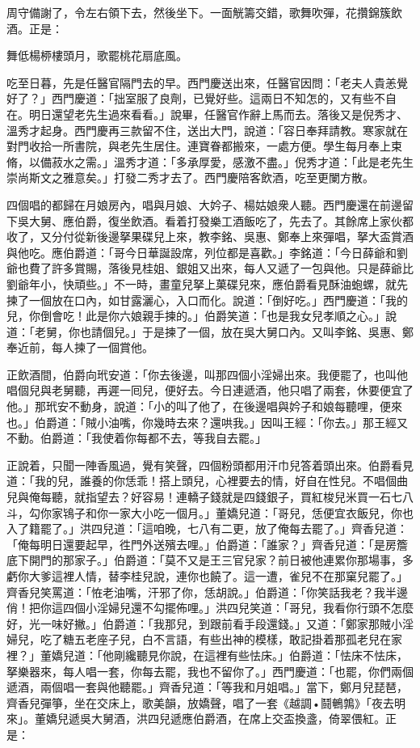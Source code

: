 周守備謝了，令左右領下去，然後坐下。一面觥籌交錯，歌舞吹彈，花攢錦簇飲酒。正是：

舞低楊桺樓頭月，歌罷桃花扇底風。

吃至日暮，先是任醫官隔門去的早。西門慶送出來，任醫官因問：「老夫人貴恙覺好了？」西門慶道：「拙室服了良劑，已覺好些。這兩日不知怎的，又有些不自在。明日還望老先生過來看看。」說畢，任醫官作辭上馬而去。落後又是倪秀才、溫秀才起身。西門慶再三款留不住，送出大門，說道：「容日奉拜請教。寒家就在對門收拾一所書院，與老先生居住。連寶眷都搬來，一處方便。學生每月奉上束脩，以備菽水之需。」溫秀才道：「多承厚愛，感激不盡。」倪秀才道：「此是老先生崇尚斯文之雅意矣。」打發二秀才去了。西門慶陪客飲酒，吃至更闌方散。

四個唱的都歸在月娘房內，唱與月娘、大妗子、楊姑娘衆人聽。西門慶還在前邊留下吳大舅、應伯爵，復坐飲酒。看着打發樂工酒飯吃了，先去了。其餘席上家伙都收了，又分付從新後邊拏果碟兒上來，教李銘、吳惠、鄭奉上來彈唱，拏大盃賞酒與他吃。應伯爵道：「哥今日華誕設席，列位都是喜歡。」李銘道：「今日薛爺和劉爺也費了許多賞賜，落後見桂姐、銀姐又出來，每人又遞了一包與他。只是薛爺比劉爺年小，快頑些。」不一時，畫童兒拏上菓碟兒來，應伯爵看見酥油蚫螺，就先揀了一個放在口內，如甘露灑心，入口而化。說道：「倒好吃。」西門慶道：「我的兒，你倒會吃！此是你六娘親手揀的。」伯爵笑道：「也是我女兒孝順之心。」說道：「老舅，你也請個兒。」于是揀了一個，放在吳大舅口內。又叫李銘、吳惠、鄭奉近前，每人揀了一個賞他。

正飲酒間，伯爵向玳安道：「你去後邊，叫那四個小淫婦出來。我便罷了，也叫他唱個兒與老舅聽，再遲一囘兒，便好去。今日連遞酒，他只唱了兩套，休要便宜了他。」那玳安不動身，說道：「小的叫了他了，在後邊唱與妗子和娘每聽哩，便來也。」伯爵道：「賊小油嘴，你幾時去來？還哄我。」因叫王經：「你去。」那王經又不動。伯爵道：「我使着你每都不去，等我自去罷。」

正說着，只聞一陣香風過，覺有笑聲，四個粉頭都用汗巾兒答着頭出來。伯爵看見道：「我的兒，誰養的你恁乖！搭上頭兒，心裡要去的情，好自在性兒。不唱個曲兒與俺每聽，就指望去？好容易！連轎子錢就是四錢銀子，買紅梭兒米買一石七八斗，勾你家鴇子和你一家大小吃一個月。」董嬌兒道：「哥兒，恁便宜衣飯兒，你也入了籍罷了。」洪四兒道：「這咱晚，七八有二更，放了俺每去罷了。」齊香兒道：「俺每明日還要起早，徃門外送殯去哩。」伯爵道：「誰家？」齊香兒道：「是房簷底下開門的那家子。」伯爵道：「莫不又是王三官兒家？前日被他連累你那場事，多虧你大爹這裡人情，替李桂兒說，連你也饒了。這一遭，雀兒不在那窠兒罷了。」{}齊香兒笑罵道：「恠老油嘴，汗邪了你，恁胡說。」伯爵道：「你笑話我老？我半邊俏！把你這四個小淫婦兒還不勾擺佈哩。」洪四兒笑道：「哥兒，我看你行頭不怎麼好，光一味好撇。」伯爵道：「我那兒，到跟前看手段還錢。」又道：「鄭家那賊小淫婦兒，吃了糖五老座子兒，白不言語，有些出神的模樣，敢記掛着那孤老兒在家裡？」董嬌兒道：「他剛纔聽見你說，在這裡有些怯床。」伯爵道：「怯床不怯床，拏樂器來，每人唱一套，你每去罷，我也不留你了。」西門慶道：「也罷，你們兩個遞酒，兩個唱一套與他聽罷。」齊香兒道：「等我和月姐唱。」當下，鄭月兒琵琶，齊香兒彈箏，坐在交床上，歌美韻，放嬌聲，唱了一套《越調•鬪鵪鶉》「夜去明來」。董嬌兒遞吳大舅酒，洪四兒遞應伯爵酒，在席上交盃換盞，倚翠偎紅。正是：

